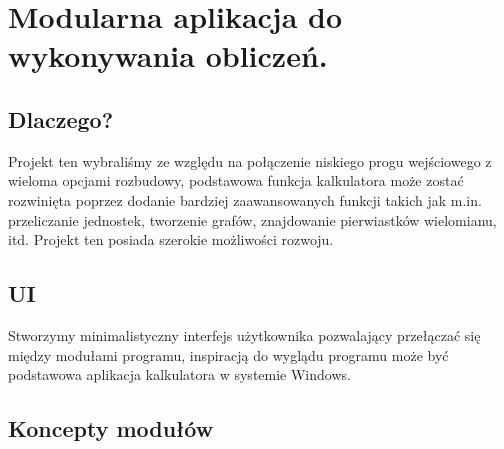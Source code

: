 \section{Modularna aplikacja do wykonywania obliczeń. }
\label{sec:github}

\subsection{Dlaczego?}
Projekt ten wybraliśmy ze względu na połączenie niskiego progu wejściowego z wieloma opcjami rozbudowy, podstawowa funkcja kalkulatora może zostać rozwinięta poprzez dodanie bardziej zaawansowanych funkcji takich jak m.in. przeliczanie jednostek, tworzenie grafów, znajdowanie pierwiastków wielomianu, itd. Projekt ten posiada szerokie możliwości rozwoju.

\subsection{UI}
Stworzymy minimalistyczny interfejs użytkownika pozwalający przełączać się między modułami programu, inspiracją do wyglądu programu może być podstawowa aplikacja kalkulatora w systemie Windows.

\subsection{Koncepty modułów}


